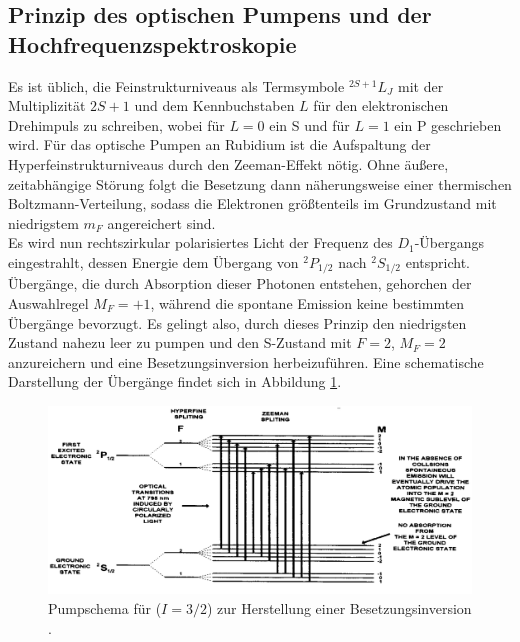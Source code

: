 \subsection{Prinzip des optischen Pumpens und der Hochfrequenzspektroskopie}
\label{subsec:prinzipOptischesPumpen} 

Es ist üblich, die Feinstrukturniveaus als Termsymbole ${}^{2S+1}L_J$ mit der Multiplizität $2S+1$ und dem Kennbuchstaben $L$ für den elektronischen Drehimpuls zu schreiben, wobei für $L=0$ ein S und für $L=1$ ein P geschrieben wird.
Für das optische Pumpen an Rubidium ist die Aufspaltung der Hyperfeinstrukturniveaus durch den Zeeman-Effekt nötig. Ohne äußere, zeitabhängige Störung folgt die Besetzung dann näherungsweise einer thermischen Boltzmann-Verteilung, sodass die Elektronen größtenteils im Grundzustand mit niedrigstem $m_F$ angereichert sind.\\
Es wird nun rechtszirkular polarisiertes Licht der Frequenz des $D_1$-Übergangs eingestrahlt, dessen Energie dem Übergang von ${}^{2}P_{1/2}$ nach ${}^{2}S_{1/2}$ entspricht. Übergänge, die durch Absorption dieser Photonen entstehen, gehorchen der Auswahlregel $M_F=+1$, während die spontane Emission keine bestimmten Übergänge bevorzugt. Es gelingt also, durch dieses Prinzip den niedrigsten Zustand nahezu leer zu pumpen und den S-Zustand mit $F=2$, $M_F=2$ anzureichern und eine Besetzungsinversion herbeizuführen. Eine schematische Darstellung der Übergänge findet sich in Abbildung \ref{fig:pumpschema}.

\begin{figure}
	\centering
	\includegraphics[width=\textwidth]{content/images/pumpschema.png}
	\caption{Pumpschema für  ($I=3/2$) zur Herstellung einer Besetzungsinversion \cite{caltech}.}
    \label{fig:pumpschema}
\end{figure}


